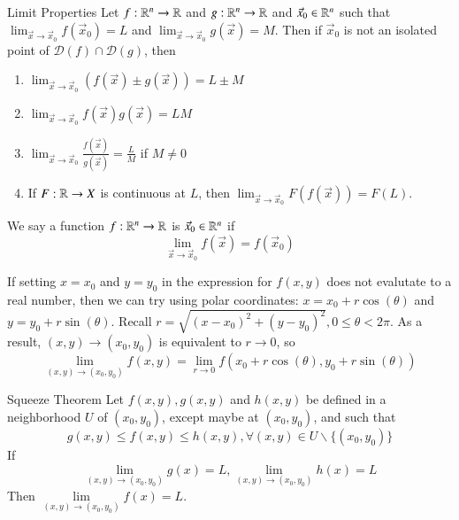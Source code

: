 \documentclass[12pt]{report}
\begin{document}
\begin{appendices}
    \begin{rmk}{Limit Properties}{}
        Let $f:\mathbb R^n\rightarrow \mathbb R$ and $g:\mathbb R^n\rightarrow \mathbb R$ and $\vec{x}_0\in \mathbb R^n$ such that $\lim_{\vec{x}\rightarrow \vec{x}_0}f(\vec{x}_0) = L$ and $\lim_{\vec{x}\rightarrow \vec{x}_0}g(\vec{x}) = M$. Then if $\vec{x}_0$ is not an isolated point of $\mathscr{D}(f) \cap \mathscr{D}(g)$, then \begin{enumerate}
            \item $\lim_{\vec{x}\rightarrow \vec{x}_0}(f(\vec{x}) \pm g(\vec{x})) = L \pm M$
            \item $\lim_{\vec{x}\rightarrow \vec{x}_0}f(\vec{x})g(\vec{x}) = LM$
            \item $\lim_{\vec{x}\rightarrow \vec{x}_0}\frac{f(\vec{x})}{g(\vec{x})} = \frac{L}{M}$ if $M \neq 0$
            \item If $F:\mathbb R\rightarrow X$ is continuous at $L$, then $\lim_{\vec{x}\rightarrow \vec{x}_0}F(f(\vec{x})) = F(L)$.
        \end{enumerate}
    \end{rmk}

    \begin{defn}{}{}
        We say a function $f:\mathbb R^n\rightarrow \mathbb R$ is  $\vec{x}_0\in \mathbb R^n$ if \begin{equation}
            \lim_{\vec{x}\rightarrow \vec{x}_0} f(\vec{x}) = f(\vec{x}_0)
        \end{equation}
    \end{defn}


    

    \begin{rmk}{}{}
        If setting $x = x_0$ and $y = y_0$ in the expression for $f(x,y)$ does not evalutate to a real number, then we can try using polar coordinates: $x = x_0 + r\cos(\theta)$ and $y = y_0 + r\sin(\theta)$. Recall $r = \sqrt{(x-x_0)^2 + (y-y_0)^2}, 0 \leq \theta < 2\pi$. As a result, $(x,y) \rightarrow (x_0,y_0)$ is equivalent to $r\rightarrow 0$, so \begin{equation}
            \lim\limits_{(x,y) \rightarrow (x_0,y_0)}f(x,y) = \lim\limits_{r\rightarrow 0}f(x_0+r\cos(\theta), y_0+r\sin(\theta))
        \end{equation}
    \end{rmk}

    \begin{thm}{Squeeze Theorem}{}
        Let $f(x,y), g(x,y)$ and $h(x,y)$ be defined in a neighborhood $U$ of $(x_0,y_0)$, except maybe at $(x_0,y_0)$, and such that \begin{equation}
            g(x,y) \leq f(x,y) \leq h(x,y), \forall (x,y) \in U\backslash\{(x_0,y_0)\}
        \end{equation}
        If \begin{equation}
            \lim\limits_{(x,y)\rightarrow (x_0,y_0)}g(x) = L,\lim\limits_{(x,y)\rightarrow (x_0,y_0)}h(x) = L
        \end{equation}
        Then $\lim\limits_{(x,y)\rightarrow (x_0,y_0)} f(x) = L$.
    \end{thm}


\end{appendices}
\end{document}
